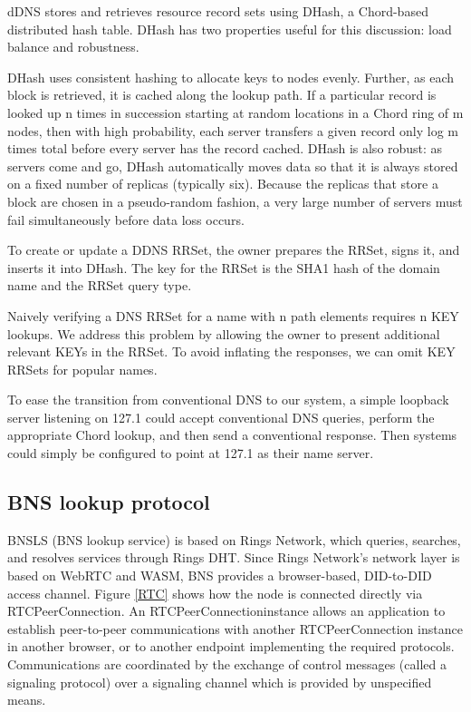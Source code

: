 \documentclass[twocolumn]{article}
\begin{document}
dDNS stores and retrieves resource record sets using DHash, a Chord-based distributed hash table. DHash has two properties useful for this discussion: load balance and robustness.

DHash uses consistent hashing to allocate keys to nodes evenly. Further, as each block is retrieved, it is cached along the lookup path. If a particular record is looked up n times in succession starting at random locations in a Chord ring of m nodes, then with high probability, each server transfers a given record only log m times total before every server has the record cached.
DHash is also robust: as servers come and go, DHash automatically moves data so that it is always stored on a fixed number of replicas (typically six). Because the replicas that store a block are chosen in a pseudo-random fashion, a very large number of servers must fail simultaneously before data loss occurs.

To create or update a DDNS RRSet, the owner prepares the RRSet, signs it, and inserts it into DHash. The key for the RRSet is the SHA1 hash of the domain name and the RRSet query type.

Naively verifying a DNS RRSet for a name with n path elements requires n KEY lookups. We address this problem by allowing the owner to present additional relevant KEYs in the RRSet. To avoid inflating the responses, we can omit KEY RRSets for popular names.

To ease the transition from conventional DNS to our system, a simple loopback server listening on 127.1 could accept conventional DNS queries, perform the appropriate Chord lookup, and then send a conventional response. Then systems could simply be configured to point at 127.1 as their name server.

\subsection{BNS lookup protocol}

BNSLS (BNS lookup service) is based on Rings Network, which queries, searches, and resolves services through Rings DHT. Since Rings Network's network layer is based on WebRTC\cite{webrtc-standard} and WASM, BNS provides a browser-based, DID-to-DID access channel. Figure \ref{RTC} shows how the node is connected directly via RTCPeerConnection. An RTCPeerConnectioninstance allows an application to establish peer-to-peer communications with another RTCPeerConnection instance in another browser, or to another endpoint implementing the required protocols. Communications are coordinated by the exchange of control messages (called a signaling protocol) over a signaling channel which is provided by unspecified means.
\end{document}
